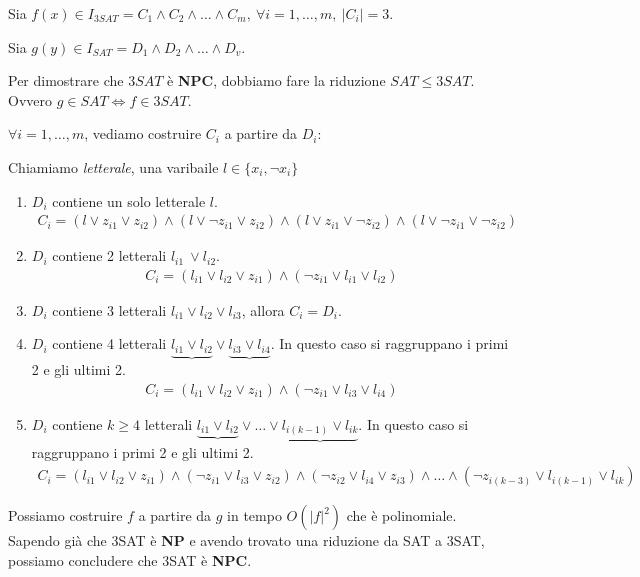 Sia $f(x) \in I_{3SAT} = C_{1} \land C_{2} \land \dots \land C_{m},\ \forall i = 1, \dots, m,\ |C_{i}| = 3$.

Sia $g(y) \in I_{SAT} = D_{1} \land D_{2} \land \dots \land D_{v}$.
\newline

Per dimostrare che $3SAT$ è \textbf{NPC}, dobbiamo fare la riduzione $SAT \leq 3SAT$. Ovvero $g \in SAT \Leftrightarrow f \in 3SAT$.

$\forall i = 1, \dots, m$, vediamo costruire $C_{i}$ a partire da $D_{i}$:

Chiamiamo \textit{letterale}, una varibaile $l \in \{x_{i}, \lnot x_{i}\}$

\begin{enumerate}
    \item {
        $D_{i}$ contiene un solo letterale $l$. 
        \begin{align*}
            C_{i} = (l \lor z_{i1} \lor z_{i2}) \land (l \lor \lnot z_{i1} \lor z_{i2})
                  \land (l \lor z_{i1} \lor \lnot z_{i2}) \land (l \lor \lnot z_{i1} \lor \lnot z_{i2})
        \end{align*}
    }
    \item {
        $D_{i}$ contiene 2 letterali $l_{i1}\ \lor l_{i2}$. 
        \begin{align*}
            C_{i} = (l_{i1} \lor l_{i2} \lor z_{i1}) \land (\lnot z_{i1} \lor l_{i1} \lor l_{i2})
        \end{align*}
    }
    \item {
        $D_{i}$ contiene 3 letterali $l_{i1} \lor l_{i2} \lor l_{i3}$, allora $C_{i} = D_{i}$. 
    }
    \item {
        $D_{i}$ contiene 4 letterali $\underbrace{l_{i1} \lor l_{i2}} \lor \underbrace{l_{i3} \lor l_{i4}}$. In questo caso si raggruppano i primi 2
        e gli ultimi 2. 
        \begin{align*}
            C_{i} = (l_{i1} \lor l_{i2} \lor z_{i1}) \land (\lnot z_{i1} \lor l_{i3} \lor l_{i4})
        \end{align*}
    }
    \item {
        $D_{i}$ contiene $k \ge 4$ letterali $\underbrace{l_{i1} \lor l_{i2}} \lor \dots \lor \underbrace{l_{i(k-1)} \lor l_{ik}}$. In questo caso si raggruppano i primi 2
        e gli ultimi 2. 
        \begin{align*}
            C_{i} = (l_{i1} \lor l_{i2} \lor z_{i1}) \land (\lnot z_{i1} \lor l_{i3} \lor z_{i2})
            \land (\lnot z_{i2} \lor l_{i4} \lor z_{i3}) \land \dots \land (\lnot z_{i(k-3)} \lor l_{i(k-1)} \lor l_{ik})
        \end{align*}
    }
\end{enumerate}

Possiamo costruire $f$ a partire da $g$ in tempo $O(|f|^2)$ che è polinomiale. Sapendo già che 3SAT è \textbf{NP} e 
avendo trovato una riduzione da SAT a 3SAT, possiamo concludere che 3SAT è \textbf{NPC}.

